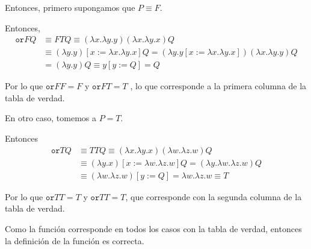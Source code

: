 \documentclass{article}
\begin{document}
\begin{enumerate}
{\begin{itemize}
{\begin{itemize}
{                            Entonces, primero supongamos que 
                            $P \equiv F$.

                            Entonces, 
                            \begin{align*}
                                \texttt{or} F Q &\equiv F T Q
                                \equiv (\lambda x. \lambda y. y)
                                (\lambda x. \lambda y. x)
                                Q \\
                                &\equiv (\lambda y. y)
                                [x:=\lambda x. \lambda y. x]
                                Q
                                =(\lambda y. y[x:=\lambda x. \lambda y. x])
                                (\lambda x. \lambda y. y) Q \\
                                &= (\lambda y. y) Q \equiv y[y := Q] = Q
                            \end{align*}

                            Por lo que $\texttt{or}FF = F$ y $\texttt{or}FT = T$
                            , lo que corresponde a la primera columna de la
                            tabla de verdad.

                            En otro caso, tomemos a $P = T$.

                            Entonces
                            \begin{align*}
                                \texttt{or} T Q &\equiv T T Q
                                \equiv (\lambda x. \lambda y. x)
                                (\lambda w. \lambda z. w)
                                Q \\
                                &\equiv (\lambda y. x)
                                [x:=\lambda w. \lambda z. w]
                                Q
                                =(\lambda y. \lambda w. \lambda z. w) Q \\
                                &\equiv (\lambda w. \lambda z. w) [y := Q] 
                                = \lambda w. \lambda z. w \equiv T
                            \end{align*}

                            Por lo que $\texttt{or}TT = T$ y $\texttt{or}TT = T$,
                            que corresponde con la segunda columna de la tabla
                            de verdad.

                            Como la función corresponde en todos los casos con
                            la tabla de verdad, entonces la definición de la 
                            función es correcta.


}
\end{itemize}}
\end{itemize}}
\end{enumerate}
\end{document}
